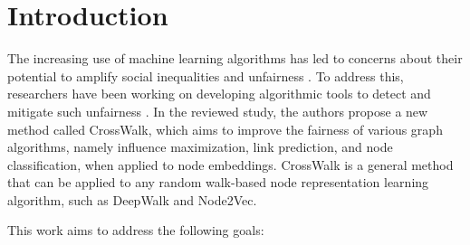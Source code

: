 \section{Introduction}
The increasing use of machine learning algorithms has led to concerns about their potential to amplify social inequalities and unfairness \cite{10.1145/3494672}. To address this, researchers have been working on developing algorithmic tools to detect and mitigate such unfairness \cite{DBLP:journals/corr/abs-1908-09635} \cite{DBLP:journals/corr/abs-1901-10002}. In the reviewed study, the authors propose a new method called CrossWalk, which aims to improve the fairness of various graph algorithms, namely influence maximization, link prediction, and node classification, when applied to node embeddings. CrossWalk is a general method that can be applied to any random walk-based node representation learning algorithm, such as DeepWalk and Node2Vec. 
\vspace{1mm}


This work aims to address the following goals:

